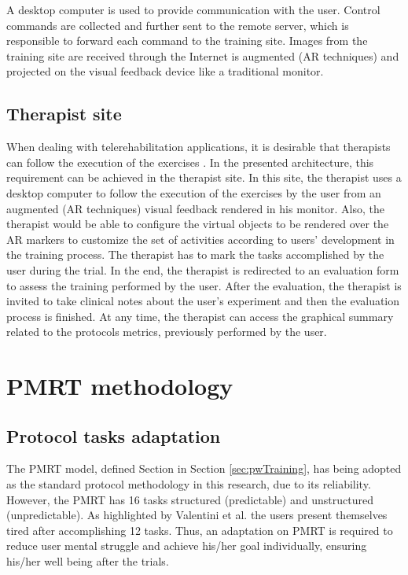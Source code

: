 A  desktop computer is used to provide communication with the user. Control commands are collected and further sent to the remote server, which is responsible to forward each command to the training site. Images from the training site are received through the Internet is augmented (AR techniques) and projected on the visual feedback device like a traditional monitor.


\subsection{Therapist site}
\label{sec:supersionenv}

When dealing with telerehabilitation applications, it is desirable that therapists can follow the execution of the exercises \cite{burdea2004}. In the presented architecture, this requirement can be achieved in the therapist site. In this site, the therapist uses a  desktop computer to follow the execution of the exercises by the user from an augmented (AR techniques) visual feedback rendered in his monitor. Also, the therapist would be able to configure the virtual objects to be rendered over the AR markers to customize the set of activities according to users' development in the training process. The therapist has to mark the tasks accomplished by the user during the trial. In the end, the therapist is redirected to an evaluation form to assess the training performed by the user. After the evaluation, the therapist is invited to take clinical notes about the user's experiment and then the evaluation process is finished. At any time, the therapist can access the graphical summary related to the protocols metrics, previously performed by the user.


\section{PMRT methodology}
\label{sec:pmrtmethods}

\subsection{Protocol tasks adaptation}
\label{sec:protocoTadaptation}

The PMRT model, defined  Section in Section \ref{sec:pwTraining}, has being adopted as the standard protocol methodology in this research, due to its reliability. However, the PMRT has 16 tasks structured (predictable) and unstructured (unpredictable). As highlighted by Valentini et al. \cite{valentini2019} the users present themselves tired after accomplishing 12 tasks. Thus, an adaptation on PMRT is required to reduce user mental struggle and achieve his/her goal individually, ensuring his/her well being after the trials.

